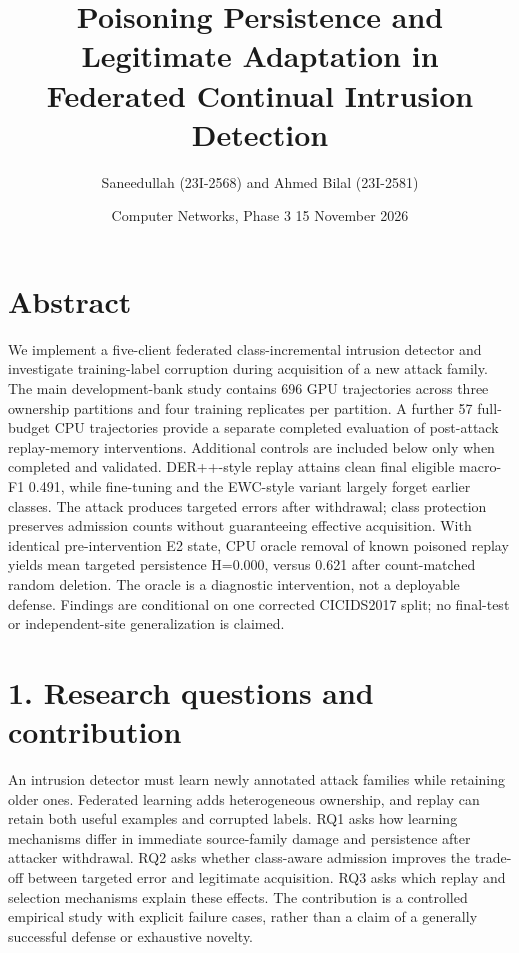\documentclass[
  10pt,
  a4paper,
]{article}
\title{Poisoning Persistence and Legitimate Adaptation in Federated
Continual Intrusion Detection}
\author{Saneedullah (23I-2568) and Ahmed Bilal (23I-2581)}
\date{Computer Networks, Phase 3 \textbar{} 15 November 2026}
\begin{document}
\maketitle

\hypertarget{abstract}{%
\section{Abstract}\label{abstract}}

We implement a five-client federated class-incremental intrusion
detector and investigate training-label corruption during acquisition of
a new attack family. The main development-bank study contains 696 GPU
trajectories across three ownership partitions and four training
replicates per partition. A further 57 full-budget CPU trajectories
provide a separate completed evaluation of post-attack replay-memory
interventions. Additional controls are included below only when
completed and validated. DER++-style replay attains clean final eligible
macro-F1 0.491, while fine-tuning and the EWC-style variant largely
forget earlier classes. The attack produces targeted errors after
withdrawal; class protection preserves admission counts without
guaranteeing effective acquisition. With identical pre-intervention E2
state, CPU oracle removal of known poisoned replay yields mean targeted
persistence H=0.000, versus 0.621 after count-matched random deletion.
The oracle is a diagnostic intervention, not a deployable defense.
Findings are conditional on one corrected CICIDS2017 split; no
final-test or independent-site generalization is claimed.

\hypertarget{research-questions-and-contribution}{%
\section{1. Research questions and
contribution}\label{research-questions-and-contribution}}

An intrusion detector must learn newly annotated attack families while
retaining older ones. Federated learning adds heterogeneous ownership,
and replay can retain both useful examples and corrupted labels. RQ1
asks how learning mechanisms differ in immediate source-family damage
and persistence after attacker withdrawal. RQ2 asks whether class-aware
admission improves the trade-off between targeted error and legitimate
acquisition. RQ3 asks which replay and selection mechanisms explain
these effects. The contribution is a controlled empirical study with
explicit failure cases, rather than a claim of a generally successful
defense or exhaustive novelty.
\end{document}
